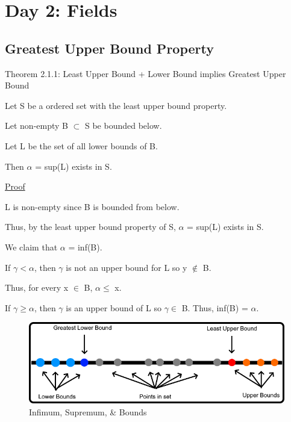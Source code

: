 \newpage
\section[Day 2: Fields]{Day 2: Fields}





\subsection{Greatest Upper Bound Property}

{ \color{red} Theorem 2.1.1: Least Upper Bound + Lower Bound implies Greatest Upper Bound }
	\begin{adjustbox}{minipage=14cm, right}
		Let S be a ordered set with the least upper bound property.

		Let non-empty B $\subset$ S be bounded below.

		Let L be the set of all lower bounds of B.

		Then $\alpha$ = sup(L) exists in S.
	\end{adjustbox}

{ \color{magenta} \underline{Proof} }

	L is non-empty since B is bounded from below.

	Thus, by the least upper bound property of S, $\alpha$ = sup(L) exists in S.

	We claim that $\alpha$ = inf(B).

	If $\gamma < \alpha$, then $\gamma$ is not an upper bound for L so y $\not \in$ B.

	Thus, for every x $\in$ B, $\alpha \leq$ x.

	If $\gamma \geq \alpha$, then $\gamma$ is an upper bound of L so $\gamma \in$ B.
	Thus, inf(B) = $\alpha$.

\begin{figure}[h]
	\centering
	\includegraphics[scale=0.5]{Images/2.1.png}
	\caption{Infimum, Supremum, \& Bounds}
\end{figure}





